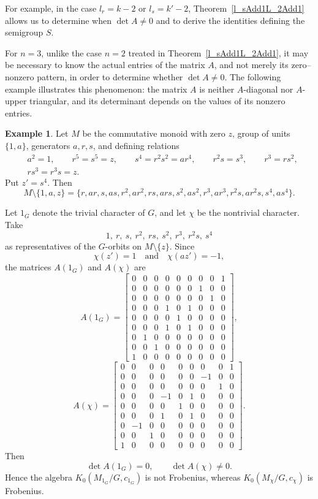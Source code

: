 \documentclass[11pt,reqno]{amsart}
\theoremstyle{plain}
\theoremstyle{remark}
\theoremstyle{definition}
\newtheorem{example}[thm]{Example}
\begin{document}
For example, in the case $l_r=k-2$ or $l_s=k'-2$, Theorem~\ref{l_sAdd1L_2Add1} allows us to determine when $\det A\neq0$ and to derive the identities defining the semigroup $S$.

For $n=3$, unlike the case $n=2$ treated in Theorem~\ref{l_sAdd1L_2Add1}, it may be necessary to know the actual entries of the matrix $A$, and not merely its zero--nonzero pattern, in order to determine whether $\det A\neq0$. The following example illustrates this phenomenon: the matrix $A$ is neither $A$-diagonal nor $A$-upper triangular, and its determinant depends on the values of its nonzero entries.

\begin{example}\label{Ex1}
Let $M$ be the commutative monoid with zero $z$, group of units $\{1,a\}$, generators $a,r,s$, and defining relations
\[
\begin{aligned}
&a^2=1,\qquad
r^5=s^5=z,\qquad
s^4=r^2s^2=ar^4,\qquad
r^2s=s^3,\qquad
r^3=rs^2,\\
&rs^3=r^3s=z.
\end{aligned}
\]
Put $z'=s^4$. Then
\[
M\setminus\{1,a,z\}
=
\{r,ar,s,as,r^2,ar^2,rs,ars,s^2,as^2,r^3,ar^3,r^2s,ar^2s,s^4,as^4\}.
\]

Let $1_G$ denote the trivial character of $G$, and let $\chi$ be the nontrivial character. Take
\[
1,\ r,\ s,\ r^2,\ rs,\ s^2,\ r^3,\ r^2s,\ s^4
\]
as representatives of the $G$-orbits on $M\setminus\{z\}$. Since
\[
\chi(z')=1
\quad\text{and}\quad
\chi(az')=-1,
\]
the matrices $A(1_G)$ and $A(\chi)$ are
\[
A(1_G)=
\begin{bmatrix}
0&0&0&0&0&0&0&0&1\\
0&0&0&0&0&0&1&0&0\\
0&0&0&0&0&0&0&1&0\\
0&0&0&1&0&1&0&0&0\\
0&0&0&0&1&0&0&0&0\\
0&0&0&1&0&1&0&0&0\\
0&1&0&0&0&0&0&0&0\\
0&0&1&0&0&0&0&0&0\\
1&0&0&0&0&0&0&0&0
\end{bmatrix},
\]\[
A(\chi)=
\begin{bmatrix}
0&0&0&0&0&0&0&0&1\\
0&0&0&0&0&0&-1&0&0\\
0&0&0&0&0&0&0&1&0\\
0&0&0&-1&0&1&0&0&0\\
0&0&0&0&1&0&0&0&0\\
0&0&0&1&0&1&0&0&0\\
0&-1&0&0&0&0&0&0&0\\
0&0&1&0&0&0&0&0&0\\
1&0&0&0&0&0&0&0&0
\end{bmatrix}.
\]
%
Then
\[\det A(1_G)=0,
\qquad
\det A(\chi)\neq0.\]
Hence the algebra
\(K_0(M_{1_G}/G,c_{1_G})\)
is not Frobenius, whereas
\(K_0(M_{\chi}/G,c_{\chi})\)
is Frobenius.
\end{example}
\end{document}
